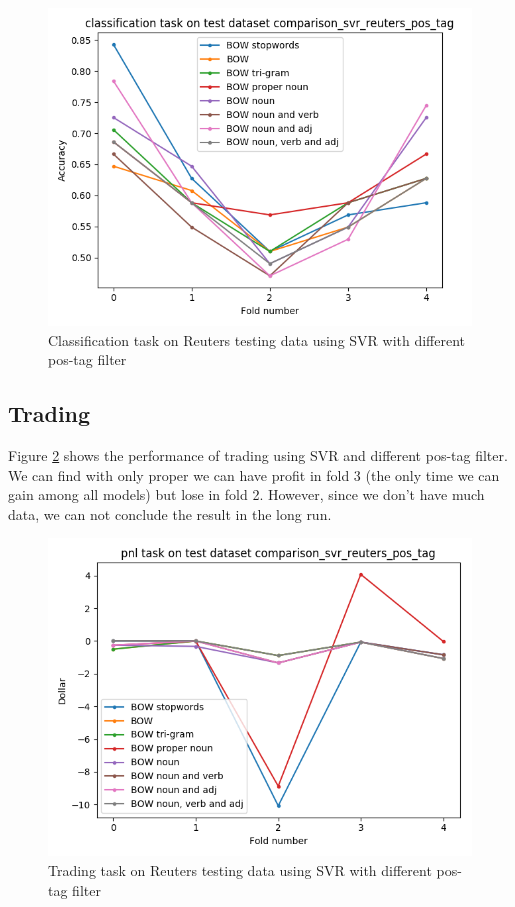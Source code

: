 \documentclass[sigconf]{acmart}
\begin{document}
\begin{figure}
  \includegraphics[width=\linewidth]{../../picture/experiment/classification_test_comparison_svr_reuters_pos_tag.png}
  \caption{Classification task on Reuters testing data using SVR with different pos-tag filter}
  \label{fig:re_cls_tag}
\end{figure}

\subsection{Trading}
Figure \ref{fig:re_pl_tag} shows the performance of trading using SVR and different pos-tag filter. We can find with only proper we can have profit in fold 3 (the only time we can gain among all models) but lose in fold 2.
However, since we don't have much data, we can not conclude the result in the long run.

\begin{figure}
  \includegraphics[width=\linewidth]{../../picture/experiment/pnl_test_comparison_svr_reuters_pos_tag.png}
  \caption{Trading task on Reuters testing data using SVR with different pos-tag filter}
  \label{fig:re_pl_tag}
\end{figure}
\end{document}
